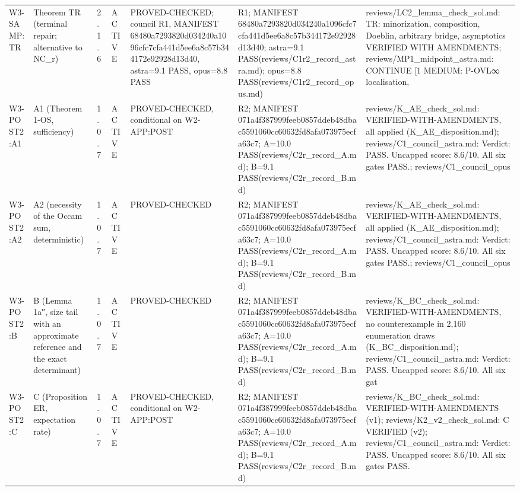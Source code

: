 \begin{longtable}{p{2.2cm}p{2.2cm}p{0.7cm}p{1.2cm}p{3.2cm}p{1.8cm}p{3cm}}
W3-SAMP:TR & Theorem TR (terminal repair; alternative to NC\_r) & 2.1.6 & ACTIVE & PROVED-CHECKED; council R1, MANIFEST 68480a7293820d034240a1096cfc7cfa441d5ee6a8c57b344172e92928d13d40, astra=9.1 PASS, opus=8.8 PASS & R1; MANIFEST 68480a7293820d034240a1096cfc7cfa441d5ee6a8c57b344172e92928d13d40; astra=9.1 PASS(reviews/C1r2\_record\_astra.md); opus=8.8 PASS(reviews/C1r2\_record\_opus.md) & reviews/LC2\_lemma\_check\_sol.md: TR: minorization, composition, Doeblin, arbitrary bridge, asymptotics VERIFIED WITH AMENDMENTS; reviews/MP1\_midpoint\_astra.md: CONTINUE [1 MEDIUM: P-OVL∞ localisation,  \\
W3-POST2:A1 & A1 (Theorem 1-OS, sufficiency) & 1.0.7 & ACTIVE & PROVED-CHECKED, conditional on W2-APP:POST & R2; MANIFEST 071a4f387999feeb0857ddeb48dbac5591060cc60632fd8afa073975ecfa63c7; A=10.0 PASS(reviews/C2r\_record\_A.md); B=9.1 PASS(reviews/C2r\_record\_B.md) & reviews/K\_AE\_check\_sol.md: VERIFIED-WITH-AMENDMENTS, all applied (K\_AE\_disposition.md); reviews/C1\_council\_astra.md: Verdict: PASS. Uncapped score: 8.6/10. All six gates PASS.; reviews/C1\_council\_opus \\
W3-POST2:A2 & A2 (necessity of the Occam sum, deterministic) & 1.0.7 & ACTIVE & PROVED-CHECKED & R2; MANIFEST 071a4f387999feeb0857ddeb48dbac5591060cc60632fd8afa073975ecfa63c7; A=10.0 PASS(reviews/C2r\_record\_A.md); B=9.1 PASS(reviews/C2r\_record\_B.md) & reviews/K\_AE\_check\_sol.md: VERIFIED-WITH-AMENDMENTS, all applied (K\_AE\_disposition.md); reviews/C1\_council\_astra.md: Verdict: PASS. Uncapped score: 8.6/10. All six gates PASS.; reviews/C1\_council\_opus \\
W3-POST2:B & B (Lemma 1a″, size tail with an approximate reference and the exact determinant) & 1.0.7 & ACTIVE & PROVED-CHECKED & R2; MANIFEST 071a4f387999feeb0857ddeb48dbac5591060cc60632fd8afa073975ecfa63c7; A=10.0 PASS(reviews/C2r\_record\_A.md); B=9.1 PASS(reviews/C2r\_record\_B.md) & reviews/K\_BC\_check\_sol.md: VERIFIED-WITH-AMENDMENTS, no counterexample in 2,160 enumeration draws (K\_BC\_disposition.md); reviews/C1\_council\_astra.md: Verdict: PASS. Uncapped score: 8.6/10. All six gat \\
W3-POST2:C & C (Proposition ER, expectation rate) & 1.0.7 & ACTIVE & PROVED-CHECKED, conditional on W2-APP:POST & R2; MANIFEST 071a4f387999feeb0857ddeb48dbac5591060cc60632fd8afa073975ecfa63c7; A=10.0 PASS(reviews/C2r\_record\_A.md); B=9.1 PASS(reviews/C2r\_record\_B.md) & reviews/K\_BC\_check\_sol.md: VERIFIED-WITH-AMENDMENTS (v1); reviews/K2\_v2\_check\_sol.md: C VERIFIED (v2); reviews/C1\_council\_astra.md: Verdict: PASS. Uncapped score: 8.6/10. All six gates PASS. \\

\end{longtable}
